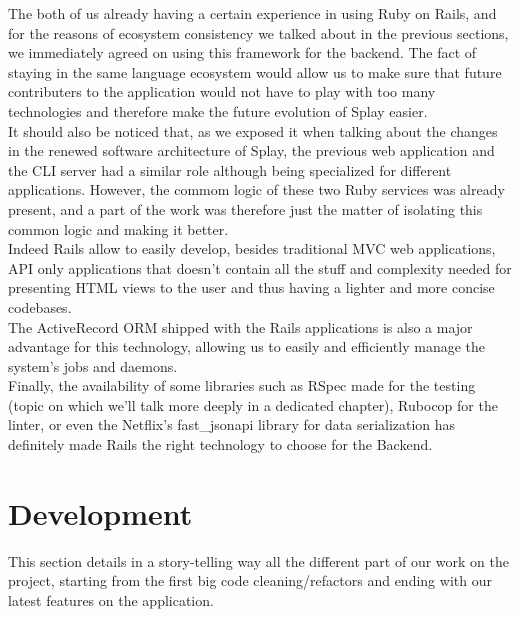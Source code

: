 \documentclass{eplmastersthesis}
\begin{document}
        The both of us already having a certain experience in using Ruby on
        Rails, and for the reasons of ecosystem consistency we talked about
        in the previous sections, we immediately agreed on using this
        framework for the backend. The fact of staying in the same language
        ecosystem would allow us to make sure that future contributers to
        the application would not have to play with too many technologies and
        therefore make the future evolution of Splay easier.\\
        It should also be noticed that, as we exposed it when talking about the
        changes in the renewed software architecture of Splay, the previous
        web application and the CLI server had a similar role although being
        specialized for different applications. However, the commom logic
        of these two Ruby services was already present, and a part of the
        work was therefore just the matter of isolating this common logic
        and making it better.\\

        Indeed Rails allow to easily develop, besides traditional MVC web
        applications, API only applications that doesn't contain all the stuff
        and complexity needed for presenting HTML views to the user and thus
        having a lighter and more concise codebases.\\
        The ActiveRecord \cite{activerecord} ORM shipped with the Rails
        applications is also a major advantage for this technology, allowing us
        to easily and efficiently manage the system's jobs and daemons.\\
        Finally, the availability of some libraries such as RSpec made for the
        testing (topic on which we'll talk more deeply in a dedicated chapter),
        Rubocop for the linter, or even the Netflix's fast\_jsonapi library for
        data serialization has definitely made Rails the right technology to
        choose for the Backend.

    \section{Development}

      This section details in a story-telling way all the different part
      of our work on the project, starting from the first big code cleaning/refactors
      and ending with our latest features on the application.\\
\end{document}
